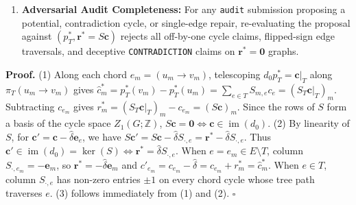 \documentclass[
  11pt,
]{article}
\newcommand{\passthrough}[1]{#1}
\providecommand{\tightlist}{%
  \setlength{\itemsep}{0pt}\setlength{\parskip}{0pt}}
\begin{document}
\begin{enumerate}
  \begin{itemize}
  \tightlist
  \item
    \textbf{Case 2a (Chord Perturbation,
    \(e^* = e_m \in E \setminus T\)):} Since
    \(S_{\cdot,\allowbreak  e_m} = -\mathbf{e}_m \in \mathbb{Z}^{b_1}\),
    a chord corruption has unit Hamming support
    \(\operatorname{supp}(\mathbf{r}^*) = \{m\}\) with
    \(r_m^* = -\delta\), and is repaired by
    \(c'_{e_m} = c_{e_m} + r_m^* = \hat{c}_m^*\) with unchanged
    potential \(p' = p_T^*\).
  \item
    \textbf{Case 2b (Spanning-Tree Perturbation, \(e^* \in T\)):} A
    tree-edge corruption propagates across the tree-cut incidence set
    \(\operatorname{supp}(\mathbf{r}^*) = \{m \in \{1,\allowbreak  \dots,\allowbreak  b_1\} : e^* \in \pi_T(u_m \to v_m)\}\)
    with \(r_m^* = \delta S_{m,\allowbreak  e^*} \in \{\pm \delta\}\),
    and is decoded by matching
    \(\mathbf{r}^* = \hat{\delta} S_{\cdot,\allowbreak  e^*}\)
    (\(c'_{e^*} = c_{e^*} - \hat{\delta}\)) and shifting the subtree
    potential
    \(p' = B_T^{-1}(\mathbf{c}|_T - \hat{\delta}\mathbf{e}_{e^*})\).
  \end{itemize}
\item
  \textbf{Adversarial Audit Completeness:} For any
  \passthrough{\lstinline!audit!} submission proposing a potential,
  contradiction cycle, or single-edge repair, re-evaluating the proposal
  against \((p_T^*,\allowbreak  \mathbf{r}^* = S\mathbf{c})\) rejects
  all off-by-one cycle claims, flipped-sign edge traversals, and
  deceptive \nolinkurl{CONTRADICTION} claims on
  \(\mathbf{r}^* = \mathbf{0}\) graphs.
\end{enumerate}

\textbf{Proof.} (1) Along each chord \(e_m = (u_m \to v_m)\),
telescoping \(d_0 p_T^* = \mathbf{c}|_T\) along \(\pi_T(u_m \to v_m)\)
gives
\(\hat{c}_m^* = p_T^*(v_m) - p_T^*(u_m) = \sum_{e \in T} S_{m,\allowbreak e} c_e = (S_T \mathbf{c}|_T)_m\).
Subtracting \(c_{e_m}\) gives
\(r_m^* = (S_T \mathbf{c}|_T)_m - c_{e_m} = (S\mathbf{c})_m\). Since the
rows of \(S\) form a basis of the cycle space \(Z_1(G; \mathbb{Z})\),
\(S\mathbf{c} = \mathbf{0} \iff \mathbf{c} \in \operatorname{im}(d_0)\).
(2) By linearity of \(S\), for
\(\mathbf{c}' = \mathbf{c} - \hat{\delta}\mathbf{e}_e\), we have
\(S\mathbf{c}' = S\mathbf{c} - \hat{\delta} S_{\cdot,\allowbreak  e} = \mathbf{r}^* - \hat{\delta} S_{\cdot,\allowbreak  e}\).
Thus
\(\mathbf{c}' \in \operatorname{im}(d_0) = \ker(S) \iff \mathbf{r}^* = \hat{\delta} S_{\cdot,\allowbreak  e}\).
When \(e = e_m \in E \setminus T\), column
\(S_{\cdot,\allowbreak  e_m} = -\mathbf{e}_m\), so
\(\mathbf{r}^* = -\hat{\delta}\mathbf{e}_m\) and
\(c'_{e_m} = c_{e_m} - \hat{\delta} = c_{e_m} + r_m^* = \hat{c}_m^*\).
When \(e \in T\), column \(S_{\cdot,\allowbreak  e}\) has non-zero
entries \(\pm 1\) on every chord cycle whose tree path traverses \(e\).
(3) follows immediately from (1) and (2). \(\square\)
\end{document}

